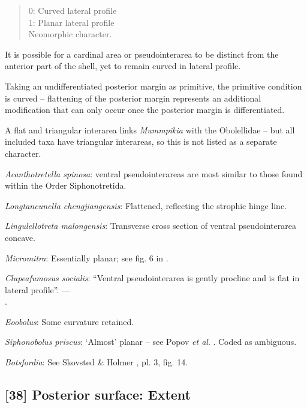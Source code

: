 \documentclass[]{book}
\theoremstyle{definition}
\theoremstyle{definition}
\theoremstyle{definition}
\theoremstyle{remark}
\begin{document}
\begin{quote}
0: Curved lateral profile\\
1: Planar lateral profile\\
Neomorphic character.
\end{quote}

It is possible for a cardinal area or pseudointerarea to be distinct
from the anterior part of the shell, yet to remain curved in lateral
profile.

Taking an undifferentiated posterior margin as primitive, the primitive
condition is curved -- flattening of the posterior margin represents an
additional modification that can only occur once the posterior margin is
differentiated.

A flat and triangular interarea links \emph{Mummpikia} with the
Obolellidae \citep{Balthasar2008iMummpikia} -- but all included taxa
have triangular interareas, so this is not listed as a separate
character.

\emph{Acanthotretella spinosa}: ventral pseudointerareas are most
similar to those found within the Order Siphonotretida.

\emph{Longtancunella chengjiangensis}: Flattened, reflecting the
strophic hinge line.

\emph{Lingulellotreta malongensis}: Transverse cross section of ventral
pseudointerarea concave.

\emph{Micromitra}: Essentially planar; see fig. 6 in
\citet{Ushatinskaya2016Protegulumand}.

\emph{Clupeafumosus socialis}: ``Ventral pseudointerarea is gently
procline and is flat in lateral profile''. ---\\
\citep{Topper2013Reappraisalof}.

\emph{Eoobolus}: Some curvature retained.

\emph{Siphonobolus priscus}: `Almost' planar -- see Popov \emph{et al}.
\citeyearpar[fig. 4]{Popov2009Earlyontogeny}. Coded as ambiguous.

\emph{Botsfordia}: See Skovsted \& Holmer
\citeyearpar{Skovsted2005EarlyCambrian}, pl. 3, fig. 14.

\hypertarget{posterior-surface-extent}{%
\subsection*{{[}38{]} Posterior surface:
Extent}\label{posterior-surface-extent}}
\end{document}
